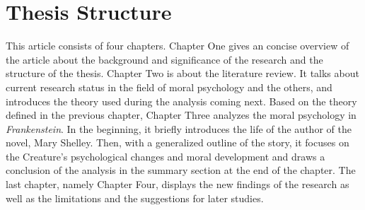 \section{Thesis Structure} %
\label{sec:thesis_structure}
\begin{text}

This article consists of four chapters. Chapter One gives an concise overview of the article about the background and significance of the research and the structure of the thesis. Chapter Two is about the literature review. It talks about current research status in the field of moral psychology and the others, and introduces the theory used during the analysis coming next. Based on the theory defined in the previous chapter, Chapter Three analyzes the moral psychology in \textit{Frankenstein}. In the beginning, it briefly introduces the life of the author of the novel, Mary Shelley. Then, with a generalized outline of the story, it focuses on the Creature's psychological changes and moral development and draws a conclusion of the analysis in the summary section at the end of the chapter. The last chapter, namely Chapter Four, displays the new findings of the research as well as the limitations and the suggestions for later studies.

\end{text}
